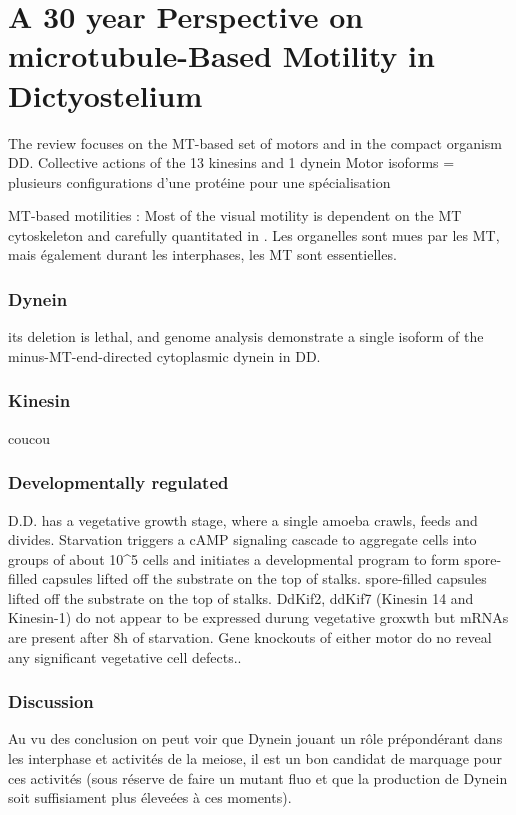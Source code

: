 \documentclass[twocolumn,10pt]{article} %
\begin{document}
\section{A 30 year Perspective on microtubule-Based Motility in Dictyostelium }
    \cite{Koonce_2020}
    The review focuses on the MT-based set of motors and in the compact organism DD. 
    Collective actions of the 13 kinesins and 1 dynein 
    Motor isoforms = plusieurs configurations d’une protéine pour une spécialisation

    MT-based motilities : Most of the visual motility is dependent on the MT cytoskeleton and carefully quantitated in
    \cite{Roos_1987}. Les organelles sont mues par les MT, mais également durant les interphases, les MT sont essentielles. 

    \subsubsection*{Dynein}
    its deletion is lethal, and genome analysis demonstrate a single isoform of the minus-MT-end-directed cytoplasmic dynein in DD. 
    \subsubsection*{Kinesin}
    coucou
    \subsubsection*{Developmentally regulated}
    D.D. has a vegetative growth stage, where a single amoeba crawls, feeds and divides. Starvation triggers a cAMP signaling cascade to aggregate cells into groups of about 10\^{}5 cells and initiates a developmental program to form spore-filled capsules lifted off the substrate on the top of stalks.
    spore-filled capsules lifted off the substrate on the top of stalks.
    DdKif2, ddKif7 (Kinesin 14 and Kinesin-1) do not appear to be expressed durung vegetative groxwth but mRNAs are present after 8h of starvation. 
    Gene knockouts of either motor do no reveal any significant vegetative cell defects.\cite{deHostos_1998}.

    \subsubsection*{Discussion}
    Au vu des conclusion on peut voir que Dynein jouant un rôle prépondérant dans les interphase et activités de la meiose,
    il est un bon candidat de marquage pour ces activités (sous réserve de faire un mutant fluo et que la production de 
    Dynein soit suffisiament plus éleveées à ces moments).
\end{document}
